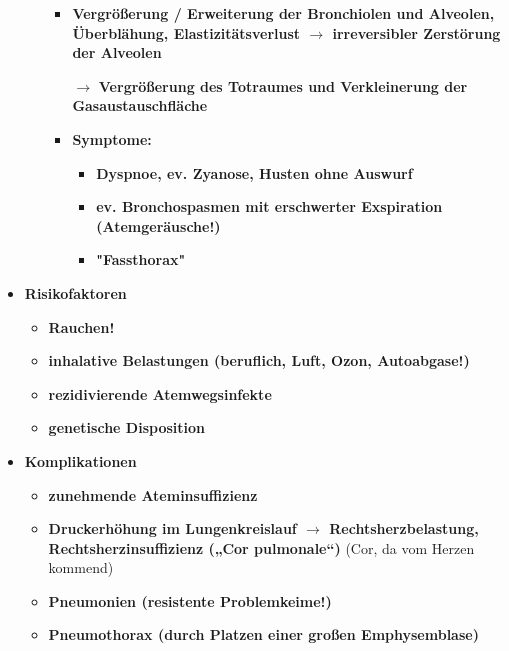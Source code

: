 \begin{itemize}
\begin{itemize}
				\begin{itemize}
					\item \textbf{Vergrößerung / Erweiterung der Bronchiolen und Alveolen, Überblähung, Elastizitätsverlust $\rightarrow$ irreversibler Zerstörung der Alveolen}
					\item[$\rightarrow$] \textbf{Vergrößerung des Totraumes und Verkleinerung der Gasaustauschfläche}
					\item \textbf{Symptome:}
						\begin{itemize}
							\item \textbf{Dyspnoe, ev. Zyanose, Husten ohne Auswurf}
							\item \textbf{ev. Bronchospasmen mit erschwerter Exspiration (Atemgeräusche!)}
							\item \textbf{"Fassthorax"}
						\end{itemize}
				\end{itemize}
			\end{itemize}
			\item \textbf{Risikofaktoren}
				\begin{itemize}
					\item \textbf{Rauchen!}
					\item \textbf{inhalative Belastungen (beruflich, Luft, Ozon, Autoabgase!)}
					\item \textbf{rezidivierende Atemwegsinfekte}
					\item \textbf{genetische Disposition}
				\end{itemize}
			\item \textbf{Komplikationen}
				\begin{itemize}
					\item \textbf{zunehmende Ateminsuffizienz}
					\item \textbf{Druckerhöhung im Lungenkreislauf $\rightarrow$ Rechtsherzbelastung, Rechtsherzinsuffizienz („Cor pulmonale“)} (Cor, da vom Herzen kommend)
					\item \textbf{Pneumonien (resistente Problemkeime!)}
					\item \textbf{Pneumothorax (durch Platzen einer großen Emphysemblase)}
				\end{itemize}
		\end{itemize}
